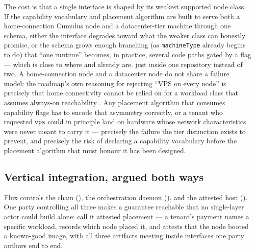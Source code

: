 The cost is that a single interface is shaped by its weakest supported node class. If the capability
vocabulary and placement algorithm are built to serve both a home-connection Cumulus node and a
datacenter-tier machine through one schema, either the interface degrades toward what the weaker class
can honestly promise, or the schema grows enough branching (as \texttt{machineType} already begins to
do) that ``one runtime'' becomes, in practice, several code paths gated by a flag — which is close to
where \FluxOS and \FluxEdge already are, just inside one repository instead of two. A home-connection
node and a datacenter node do not share a failure model: the roadmap's own reasoning for rejecting
``VPS on every node'' is precisely that home connectivity cannot be relied on for a workload class that
assumes always-on reachability . Any placement algorithm that
consumes capability flags has to encode that asymmetry correctly, or a tenant who requested
\texttt{vps} could in principle land on hardware whose network characteristics were never meant to
carry it — precisely the failure the tier distinction exists to prevent, and precisely the risk of
declaring a capability vocabulary before the placement algorithm that must honour it has been
designed.

\subsection{Vertical integration, argued both ways}

Flux controls the chain (\fluxd), the orchestration daemon (\FluxOS), and the attested host
(\ArcaneOS). One party controlling all three makes a guarantee reachable that no single-layer actor
could build alone: call it attested placement — a tenant's payment names a specific workload, \FluxOS
records which node placed it, and \ArcaneOS attests that the node booted a known-good image, with all
three artifacts meeting inside interfaces one party authors end to end.

